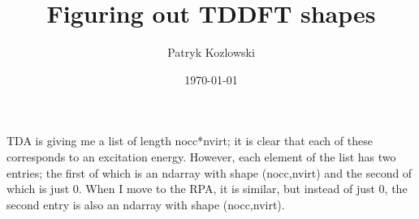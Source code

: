 \documentclass[12pt]{article}
\author{Patryk Kozlowski}
\title{Figuring out TDDFT shapes}
\date{\today}
\begin{document}
\maketitle
TDA is giving me a list of length nocc*nvirt; it is clear that each of these corresponds to an excitation energy. However, each element of the list has two entries; the first of which is an ndarray with shape (nocc,nvirt) and the second of which is just 0. When I move to the RPA, it is similar, but instead of just 0, the second entry is also an ndarray with shape (nocc,nvirt).
\end{document}
